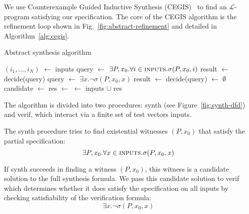 \documentclass[preprint]{sigplanconf}
\theoremstyle{definition}
\newcommand*\Let[2]{\State #1 $\gets$ #2}
\begin{document}
We use Counterexample Guided Inductive Synthesis
(CEGIS)~\cite{lezama-thesis,sketch, DBLP:conf/iclp/BrainCVF06} to find an
$\mathcal{L}$-program satisfying our specification.  The core of the CEGIS
algorithm is the refinement loop shown in Fig.~\ref{fig:abstract-refinement}
and detailed in Algorithm~\ref{alg:cegis}.

\begin{algorithm}
{\small
 \caption{Abstract synthesis algorithm
 \label{alg:cegis}}
 \begin{algorithmic}[1]
 \Statex
{}
  \Let{$(i_1, \ldots, i_N)$}{{\sc inputs}}
  \Let{query}{$\exists P, x_0 . \forall i \in \text{\sc inputs} . \sigma(P, x_0, i)$}
  \Let{result}{decide(query)}
    \State {}
  \Else
    \State {}
  \EndIf
\EndFunction
\Statex
{}
  \Let{query}{$\exists x . \lnot \sigma(P, x_0, x)$}
  \Let{result}{decide(query)}
    \State {}
  \Else
    \State {}
  \EndIf
\EndFunction
\columnbreak
\Statex
{}
  \Let{{\sc inputs}}{$\emptyset$}
  \Loop
    \Let{candidate}{}
      \State {}
    \EndIf
    \Let{res}{}
      \State {}
    \Else
      \Let{{\sc inputs}}{{\sc inputs} $\cup$ res}
    \EndIf
  \EndLoop
\EndFunction
 \end{algorithmic}
 }
\end{algorithm}

The algorithm is divided into two procedures: {\sc synth} (see Figure~\ref{fig:synth-dfd}) and {\sc
verif}, which interact via a finite set of test vectors {\sc inputs}.

The {\sc synth} procedure tries to find existential witnesses $(P, x_0)$
that satisfy the partial specification:
%
\[
 \exists P, x_0 . \forall x \in \text{\sc inputs} . \sigma(P, x_0, x)
\]

If {\sc synth} succeeds in finding a witness $(P, x_0)$, this witness is a
candidate solution to the full synthesis formula.  We pass this candidate
solution to {\sc verif} which determines whether it does satisfy
the specification on all inputs by checking satisfiability of the
verification formula:
%
\[
 \exists x . \lnot \sigma(P, x_0, x)
\]
\end{document}
